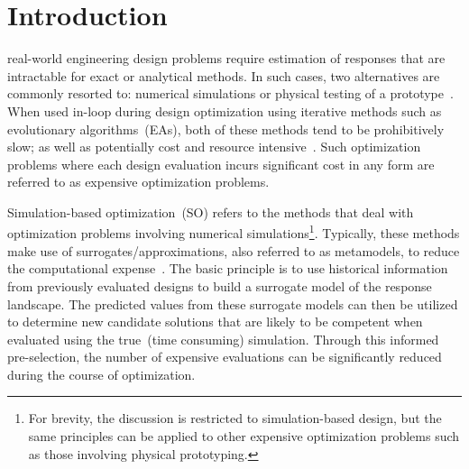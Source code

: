 \section{Introduction}
% 
% 
% 
% 

 real-world engineering design problems require estimation of responses that are intractable for exact or analytical methods. In such cases, two alternatives are commonly resorted to: numerical simulations or physical testing of a prototype~\cite{forrester2008engineering}. When used in-loop during design optimization using iterative methods such as evolutionary algorithms~(EAs), both of these methods tend to be prohibitively slow; as well as potentially cost and resource intensive~\cite{jin2009systems}. Such optimization problems where each design evaluation incurs significant cost in any form are referred to as expensive optimization problems.

Simulation-based optimization~(SO) refers to the methods that deal with optimization problems involving  numerical simulations\footnote{For brevity, the discussion is restricted to simulation-based design, but the same principles can be applied to other expensive optimization problems such as those involving physical prototyping.}. Typically, these methods make use of surrogates/approximations, also referred to as metamodels, to reduce the computational expense~\cite{amaran2016simulation}. The basic principle is to use historical information from previously evaluated designs to build a surrogate model of the response landscape. The predicted values from these surrogate models can then be utilized to determine new candidate solutions that are likely to be competent when evaluated using the true~(time consuming) simulation. Through this informed pre-selection, the number of expensive evaluations can be significantly reduced during the course of optimization. 

